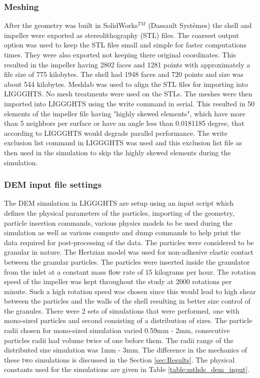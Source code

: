 \documentclass[preprint,11pt,authoryear]{elsarticle}
\begin{document}
\subsubsection{Meshing}
 After the geometry was built in SolidWorks$^{TM}$ (Dassault Syst\`{e}mes) the shell and impeller 
were exported as stereolithography (STL) files. The coarsest output option was used to keep the STL files small and 
simple for faster computations times. They were also exported not keeping there original coordinates.  
This resulted in the impeller having 2802 faces and 1281 points with approximately a file size of 775 
kilobytes. The shell had 1948 faces and 720 points and size was about 544 kilobytes.  
 Meshlab was used to align the STL files for importing into LIGGGHTS. No mesh treatments were 
used on the STLs. 
 The meshes were then imported into LIGGGHTS using the write command in serial. This resulted 
in 50 elements of the impeller file having "highly skewed elements", which have more than 5 
neighbors per surface or have an angle less than 0.0181185 degree, that according to LIGGGHTS 
would degrade parallel performance. The write exclusion list command in LIGGGHTS was used and 
this exclusion list file as then used in the simulation to skip the highly skewed elements during the 
simulation. 

\subsubsection{DEM input file settings}
The DEM simulation in LIGGGHTS are setup using an input script which defines the physical 
parameters of the particles, importing of the geometry, particle insertion commands, various physics 
models to be used during the simulation as well as various compute and dump commands to help print 
the data required for post-processing of the data. The particles were considered to be granular in 
nature. The Hertzian model was used for non-adhesive elastic contact between the granular particles. 
The particles were inserted inside the granulator from the inlet at a constant mass flow rate of 15 
kilograms per hour. The rotation speed of the impeller was kept throughout the study at 2000 rotations 
per minute. Such a high rotation speed was chosen since this would lead to high shear between the 
particles and the walls of the shell resulting in better size control of the granules. There were 2 sets of 
simulations that were performed, one with mono-sized particles and second consisting of a distribution 
of sizes. The particle radii chosen for mono-sized simulation varied 0.59mm - 2mm, consecutive 
particles radii had volume twice of one before them. The radii range of the distributed size simulation 
was 1mm - 3mm. The difference in the mechanics of these two simulations is discussed in the Section \ref{sec:Results}. 
The physical constants used for the simulations are given in Table 
\ref{table:mthds_dem_input}.
\end{document}
